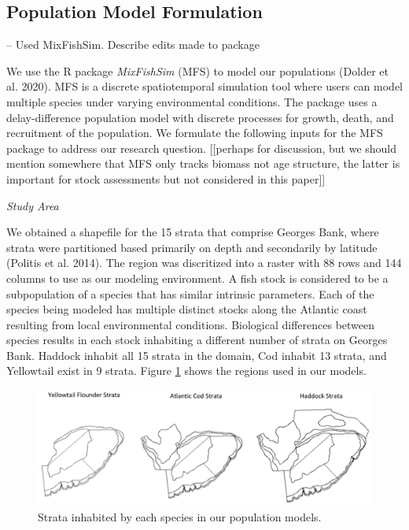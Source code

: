 \documentclass[
  12pt,
]{article}
\begin{document}
\subsection{Population Model Formulation}

-- Used MixFishSim. Describe edits made to package

We use the R package \emph{MixFishSim} (MFS) to model our populations (Dolder et al. 2020). MFS is a discrete spatiotemporal simulation tool where users can model multiple species under varying environmental conditions. The package uses a delay-difference population model with discrete processes for growth, death, and recruitment of the population. We formulate the following inputs for the MFS package to address our research question. {[}{[}perhaps for discussion, but we should mention somewhere that MFS only tracks biomass not age structure, the latter is important for stock assessments but not considered in this paper{]}{]}

\emph{Study Area}

We obtained a shapefile for the 15 strata that comprise Georges Bank, where strata were partitioned based primarily on depth and secondarily by latitude (Politis et al. 2014). The region was discritized into a raster with 88 rows and 144 columns to use as our modeling environment. A fish stock is considered to be a subpopulation of a species that has similar intrinsic parameters. Each of the species being modeled has multiple distinct stocks along the Atlantic coast resulting from local environmental conditions. Biological differences between species results in each stock inhabiting a different number of strata on Georges Bank. Haddock inhabit all 15 strata in the domain, Cod inhabit 13 strata, and Yellowtail exist in 9 strata. Figure \ref{fig:strata-plot} shows the regions used in our models.

\begin{figure}

{\centering \includegraphics[width=0.95\linewidth]{Images/Strata} 

}

\caption{Strata inhabited by each species in our population models.}\label{fig:strata-plot}
\end{figure}
\end{document}

